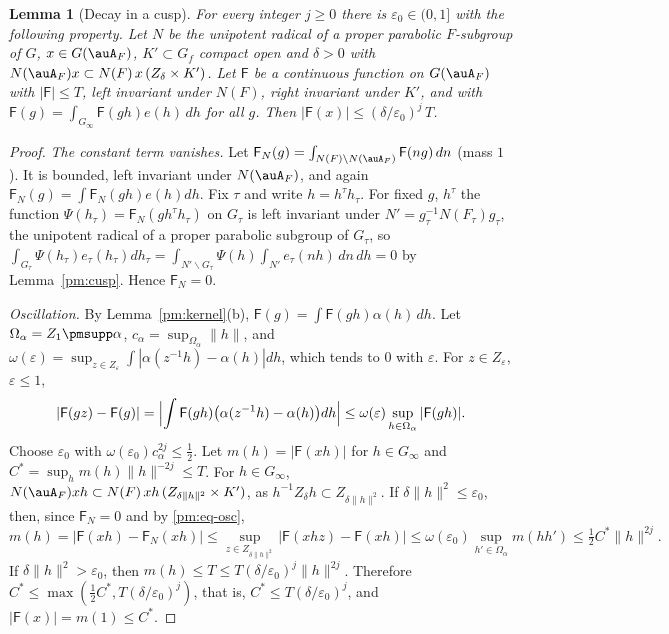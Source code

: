 \documentclass[10pt]{amsart}
\newtheorem{lemma}[theorem]{Lemma}
\theoremstyle{definition}
\theoremstyle{remark}
\begin{document}
\begin{lemma}[Decay in a cusp]\label{pm:decay}
For every integer $j\ge0$ there is $\varepsilon_0\in(0,1]$ with the following property. Let $N$
be the unipotent radical of a proper parabolic $F$-subgroup of $G$, $x\in G(\auA_F)$,
$K'\subset G_f$ compact open and $\delta>0$ with $N(\auA_F)x\subset N(F)\,x\,(Z_\delta\times K')$.
Let $\mathsf F$ be a continuous function on $G(\auA_F)$ with $|\mathsf F|\le T$, left invariant
under $N(F)$, right invariant under $K'$, and with $\mathsf F(g)=\int_{G_\infty}\mathsf F(gh)e(h)\,dh$
for all $g$. Then $|\mathsf F(x)|\le(\delta/\varepsilon_0)^j\,T$.
\end{lemma}
\begin{proof}
\emph{The constant term vanishes.} Let $\mathsf F_N(g)=\int_{N(F)\backslash N(\auA_F)}\mathsf F(ng)\,
dn$ (mass $1$). It is bounded, left invariant under $N(\auA_F)$, and again
$\mathsf F_N(g)=\int\mathsf F_N(gh)e(h)dh$. Fix $\tau$ and write $h=h^\tau h_\tau$. For fixed $g$,
$h^\tau$ the function $\Psi(h_\tau)=\mathsf F_N(gh^\tau h_\tau)$ on $G_\tau$ is left invariant under
$N'=g_\tau^{-1}N(F_\tau)g_\tau$, the unipotent radical of a proper parabolic subgroup of $G_\tau$, so
$\int_{G_\tau}\Psi(h_\tau)e_\tau(h_\tau)dh_\tau=\int_{N'\backslash G_\tau}\Psi(h)\int_{N'}e_\tau(nh)\,dn\,dh
=0$ by Lemma~\ref{pm:cusp}. Hence $\mathsf F_N=0$.

\emph{Oscillation.} By Lemma~\ref{pm:kernel}(b), $\mathsf F(g)=\int\mathsf F(gh)\alpha(h)\,dh$.
Let $\Omega_\alpha=Z_1\pmsupp\alpha$, $c_\alpha=\sup_{\Omega_\alpha}\|h\|$, and
$\omega(\varepsilon)=\sup_{z\in Z_\varepsilon}\int|\alpha(z^{-1}h)-\alpha(h)|dh$, which tends to $0$
with $\varepsilon$. For $z\in Z_\varepsilon$, $\varepsilon\le1$,
\begin{equation}\label{pm:eq-osc}
|\mathsf F(gz)-\mathsf F(g)|=\Bigl|\int\mathsf F(gh)\bigl(\alpha(z^{-1}h)-\alpha(h)\bigr)dh\Bigr|
\le\omega(\varepsilon)\sup_{h\in\Omega_\alpha}|\mathsf F(gh)| .
\end{equation}
Choose $\varepsilon_0$ with $\omega(\varepsilon_0)c_\alpha^{2j}\le\tfrac12$. Let
$m(h)=|\mathsf F(xh)|$ for $h\in G_\infty$ and $C^*=\sup_hm(h)\|h\|^{-2j}\le T$. For $h\in G_\infty$,
$N(\auA_F)xh\subset N(F)\,xh\,(Z_{\delta\|h\|^2}\times K')$, as $h^{-1}Z_\delta h\subset
Z_{\delta\|h\|^2}$. If $\delta\|h\|^2\le\varepsilon_0$, then, since $\mathsf F_N=0$ and by
\eqref{pm:eq-osc},
\[
m(h)=|\mathsf F(xh)-\mathsf F_N(xh)|\le\sup_{z\in Z_{\delta\|h\|^2}}|\mathsf F(xhz)-\mathsf F(xh)|
\le\omega(\varepsilon_0)\sup_{h'\in\Omega_\alpha}m(hh')\le\tfrac12C^*\|h\|^{2j}.
\]
If $\delta\|h\|^2>\varepsilon_0$, then $m(h)\le T\le T(\delta/\varepsilon_0)^j\|h\|^{2j}$. Therefore
$C^*\le\max(\tfrac12C^*,T(\delta/\varepsilon_0)^j)$, that is, $C^*\le T(\delta/\varepsilon_0)^j$, and
$|\mathsf F(x)|=m(1)\le C^*$.
\end{proof}
\end{document}
